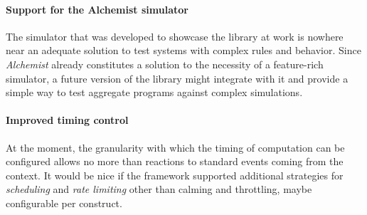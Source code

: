 \paragraph{Support for the Alchemist simulator}

The simulator that was developed to showcase the library at work is nowhere near an adequate solution to test systems with complex rules and behavior.
%
Since \textit{Alchemist} \cite{pianini2013chemical} already constitutes a solution to the necessity of a feature-rich simulator, a future version of the library might integrate with it and provide a simple way to test aggregate programs against complex simulations.

\paragraph{Improved timing control}

At the moment, the granularity with which the timing of computation can be configured allows no more than reactions to standard events coming from the context.
%
It would be nice if the framework supported additional strategies for \textit{scheduling} and \textit{rate limiting} other than calming and throttling, maybe configurable per construct.
